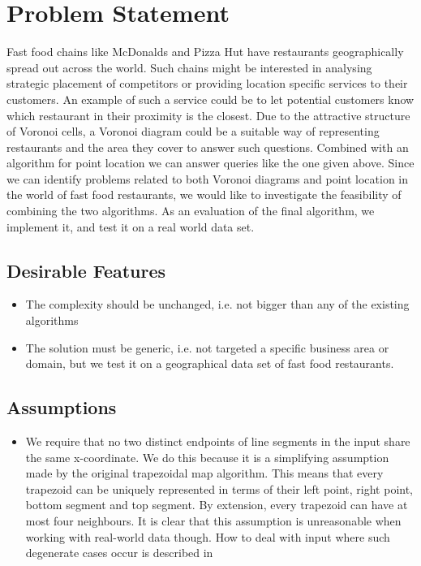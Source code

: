 \section{Problem Statement}
Fast food chains like McDonalds and Pizza Hut have restaurants geographically spread out across the world. Such chains might be interested in analysing strategic placement of competitors or providing location specific services to their customers. An example of such a service could be to let potential customers know which restaurant in their proximity is the closest. Due to the attractive structure of Voronoi cells, a Voronoi diagram could be a suitable way of representing restaurants and the area they cover to answer such questions. Combined with an algorithm for point location we can answer queries like the one given above.
Since we can identify problems related to both Voronoi diagrams and point location in the world of fast food restaurants, we would like to investigate the feasibility of combining the two algorithms. As an evaluation of the final algorithm, we implement it, and test it on a real world data set.

\subsection{Desirable Features}
\label{desirable_features}

\begin{itemize}
  \item The complexity should be unchanged, i.e. not bigger than any of the existing algorithms
  \item The solution must be generic, i.e. not targeted a specific business area or domain, but we test it on a geographical data set of fast food restaurants. 
\end{itemize}

\subsection{Assumptions}
\label{assumptions}

\begin{itemize}
  \item We require that no two distinct endpoints of line segments in the input share the same x-coordinate. We do this because it is a simplifying assumption made by the original trapezoidal map algorithm. This means that every trapezoid can be uniquely represented in terms of their left point, right point, bottom segment and top segment. By extension, every trapezoid can have at most four neighbours. It is clear that this assumption is unreasonable when working with real-world data though. How to deal with input where such degenerate cases occur is described in \cite{computational_geometry}
\end{itemize}





